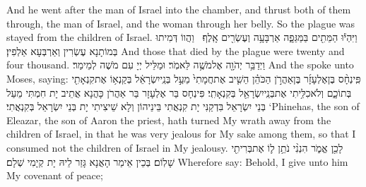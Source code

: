 {And he went after the man of Israel into the chamber, and thrust both of them through, the man of Israel, and the woman through her belly. So the plague was stayed from the children of Israel.}{}
{וַיִּהְי֕וּ הַמֵּתִ֖ים בַּמַּגֵּפָ֑ה אַרְבָּעָ֥ה וְעֶשְׂרִ֖ים אָֽלֶף׃ \petucha }
{וַהֲווֹ דְּמִיתוּ בְּמוֹתָנָא עֶשְׂרִין וְאַרְבְּעָא אַלְפִין׃}
{And those that died by the plague were twenty and four thousand.}{}
{וַיְדַבֵּ֥ר יְהֹוָ֖ה אֶל\maqqaf מֹשֶׁ֥ה לֵּאמֹֽר׃}
{וּמַלֵּיל יְיָ עִם מֹשֶׁה לְמֵימַר׃}
{And the \lord\space spoke unto Moses, saying:}{}
{פִּֽינְחָ֨ס בֶּן\maqqaf אֶלְעָזָ֜ר בֶּן\maqqaf אַהֲרֹ֣ן הַכֹּהֵ֗ן הֵשִׁ֤יב אֶת\maqqaf חֲמָתִי֙ מֵעַ֣ל בְּנֵֽי\maqqaf יִשְׂרָאֵ֔ל בְּקַנְא֥וֹ אֶת\maqqaf קִנְאָתִ֖י בְּתוֹכָ֑ם וְלֹא\maqqaf כִלִּ֥יתִי אֶת\maqqaf בְּנֵֽי\maqqaf יִשְׂרָאֵ֖ל בְּקִנְאָתִֽי׃}
{פִּינְחָס בַּר אֶלְעָזָר בַּר אַהֲרֹן כָּהֲנָא אֲתֵיב יָת חִמְתִּי מֵעַל בְּנֵי יִשְׂרָאֵל בִּדְקַנִּי יָת קִנְאֲתִי בֵּינֵיהוֹן וְלָא שֵׁיצִיתִי יָת בְּנֵי יִשְׂרָאֵל בְּקִנְאֲתִי׃}
{‘Phinehas, the son of Eleazar, the son of Aaron the priest, hath turned My wrath away from the children of Israel, in that he was very jealous for My sake among them, so that I consumed not the children of Israel in My jealousy.}{}
{לָכֵ֖ן אֱמֹ֑ר הִנְנִ֨י נֹתֵ֥ן ל֛וֹ אֶת\maqqaf בְּרִיתִ֖י שָׁלֽוֹם׃}
{בְּכֵין אֵימַר הָאֲנָא גָּזַר לֵיהּ יָת קְיָמִי שְׁלָם׃}
{Wherefore say: Behold, I give unto him My covenant of peace;}{}
